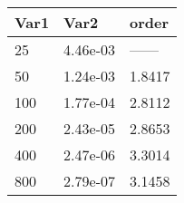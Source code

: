 \begin{tabular}{lll}
Var1 & Var2 & order \\ 
\hline 
25 & 4.46e-03 & ------ \\ 
50 & 1.24e-03 & 1.8417 \\ 
100 & 1.77e-04 & 2.8112 \\ 
200 & 2.43e-05 & 2.8653 \\ 
400 & 2.47e-06 & 3.3014 \\ 
800 & 2.79e-07 & 3.1458 \\ 
\hline 
\end{tabular}